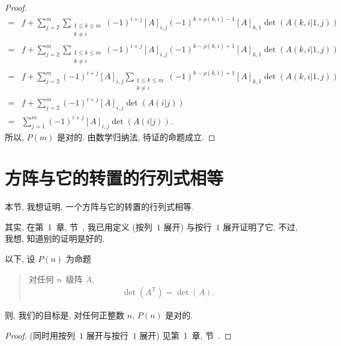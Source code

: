 \documentclass[../libro.tex]{subfiles}
\begin{document}
\begin{proof}
\begin{align*}
        = {} &
        f + \sum_{j = 2}^{m}
        {\sum_{\substack{1 \leq k \leq m \\ k \neq i}}
            {(-1)^{i+j} [A]_{i,j}
                (-1)^{k + \rho(k,i) - 1}
        [A]_{k,1} \det {(A(k,i|1,j))}}}
        \\
        = {} &
        f + \sum_{j = 2}^{m}
        {\sum_{\substack{1 \leq k \leq m \\ k \neq i}}
            {(-1)^{i+j} [A]_{i,j}
                (-1)^{k - \rho(k,i) + 1}
        [A]_{k,1} \det {(A(k,i|1,j))}}}
        \\
        = {} &
        f + \sum_{j = 2}^{m}
        {(-1)^{i+j} [A]_{i,j}
            \sum_{\substack{1 \leq k \leq m \\ k \neq i}}
            {(-1)^{k - \rho(k,i) + 1}
        [A]_{k,1} \det {(A(k,i|1,j))}}}
        \\
        = {} &
        f + \sum_{j = 2}^{m}
        {(-1)^{i+j} [A]_{i,j} \det {(A(i|j))}}
        \\
        = {} &
        \sum_{j = 1}^{m}
        {(-1)^{i+j} [A]_{i,j} \det {(A(i|j))}}.
    \end{align*}
    所以, \(P(m)\) 是对的.
    由数学归纳法, 待证的命题成立.
\end{proof}

\section{方阵与它的转置的行列式相等}

本节, 我想证明, 一个方阵与它的转置的行列式相等.

其实, 在第~1~章, 节~,
我已用定义 (按列~\(1\) 展开)
与按行~\(1\) 展开证明了它.
不过, 我想, 知道别的证明是好的.

以下, 设 \(P(n)\) 为命题
\begin{quotation}
    对任何 \(n\)~级阵 \(A\),
    \begin{align*}
        \det {(A^{\mathrm{T}})} = \det {(A)}.
    \end{align*}
\end{quotation}
则, 我们的目标是,
对任何正整数 \(n\), \(P(n)\) 是对的.

\begin{proof}
    (同时用按列~\(1\) 展开与按行~\(1\) 展开)
    见第~1~章, 节~.
\end{proof}
\end{document}
